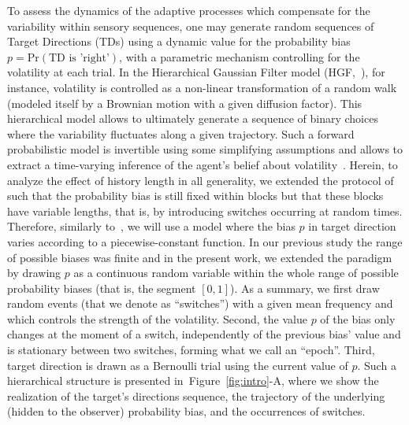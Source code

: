 \documentclass[12pt,english]{article}%
\newcommand{\citep}[1]{\parencite{#1}}
\newcommand{\citet}[1]{\textcite{#1}}
\newcommand{\seeFig}[1]{Figure~\ref{fig:#1}}
\begin{document}
To assess the dynamics of the adaptive processes
which compensate for the variability within sensory sequences,
one may generate random sequences of Target Directions (TDs)
using a dynamic value for the probability bias $p = \text{Pr}(\text{TD is 'right'})$,
with a parametric mechanism controlling for the volatility at each trial.
In the Hierarchical Gaussian Filter model (HGF,~\citet{Mathys11}), for instance,
volatility is controlled as a non-linear transformation
of a random walk (modeled itself by a Brownian motion with a given diffusion factor).
This hierarchical model allows to ultimately generate a sequence of binary choices
where the variability fluctuates along a given trajectory.
Such a forward probabilistic model is invertible
using some simplifying assumptions and allows
to extract a time-varying inference of the agent's belief about volatility~\citep{Vossel14}.
Herein, to analyze the effect of history length in all generality,
we  extended the protocol of~\citep{Montagnini2010} such that the probability bias
is still fixed within blocks but that these blocks have variable lengths,
that is, by introducing switches occurring at random times.
Therefore, similarly to~\citet{Meyniel13}, we will use a model where
the bias $p$ in target direction varies according to a piecewise-constant function.
In our previous study
the range of possible biases was finite
and in the present work, we extended the paradigm
by drawing $p$ as a continuous random variable
within the whole range of possible probability biases (that is, the segment $[ 0, 1 ]$).
As a summary, we first draw random events (that we denote as ``switches'')
with a given mean frequency and which controls the strength of the volatility.
Second, the value $p$ of the bias only changes at the moment of a switch,
independently of the previous bias' value
and is stationary between two switches, forming what we call an ``epoch''.
Third, target direction is drawn as a Bernoulli trial using the current value of $p$.
Such a hierarchical structure is presented in~\seeFig{intro}-A,
where we show the realization of the target's directions sequence,
the trajectory of the underlying (hidden to the observer) probability bias, and
the occurrences of switches.
\end{document}
